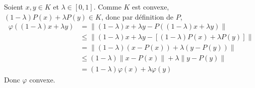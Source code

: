 \documentclass{report}
\begin{document}
\subsection{} \noindent{}\\ 
\\ 
\\
\noindent Soient $x,y\in K$ et $\lambda \in [0,1]$.\newline
Comme $K$ est convexe, $(1-\lambda)P(x) + \lambda P(y)\in K$, donc par définition de $P$,
$$\begin{aligned}\varphi((1-\lambda)x  + \lambda y) &= \|(1-\lambda)x  + \lambda y - P((1-\lambda)x  + \lambda y)\| \\
&\leq \|(1-\lambda)x  + \lambda y - [(1-\lambda)P(x) + \lambda P(y)] \| \\
&= \| (1-\lambda)(x-P(x)) + \lambda (y-P(y))\| \\
&\leq (1-\lambda) \|x-P(x)\| + \lambda \|y-P(y)\| \\
&= (1-\lambda) \varphi(x) + \lambda \varphi(y)
\end{aligned}$$
Donc $\varphi$ convexe.
\end{document}
